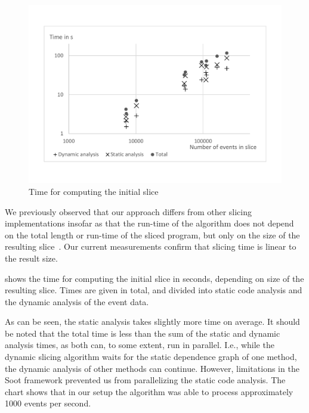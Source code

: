 \documentclass[
			english,
			review,
			]{elsarticle}
\begin{document}
\begin{figure}
	\centering
		\includegraphics[width=\linewidth, clip, trim={20mm 26mm 20mm 26mm}]{chart-initial.pdf}
	\caption{Time for computing the initial slice}
	\label{fig:chartinitial}
\end{figure}

We previously observed that our approach differs from other slicing implementations insofar as that the run-time of the algorithm does not depend on the total length or run-time of the sliced program, but only on the size of the resulting slice~\cite{treffer_dynamic_2014}.
Our current measurements confirm that slicing time is linear to the result size.

 shows the time for computing the initial slice in seconds, depending on size of the resulting slice.
Times are given in total, and divided into static code analysis and the dynamic analysis of the event data.

As can be seen, the static analysis takes slightly more time on average.
It should be noted that the total time is less than the sum of the static and dynamic analysis times, as both can, to some extent, run in parallel.
I.e., while the dynamic slicing algorithm waits for the static dependence graph of one method, the dynamic analysis of other methods can continue.
However, limitations in the Soot framework prevented us from parallelizing the static code analysis.
The chart shows that in our setup the algorithm was able to process approximately 1000 events per second.
\end{document}
